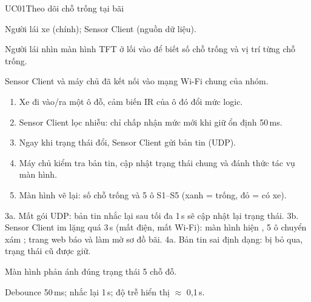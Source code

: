 \begin{usecase}{UC01}{Theo dõi chỗ trống tại bãi}
\item[Tác nhân] Người lái xe (chính); Sensor Client (nguồn dữ liệu).
\item[Mô tả] Người lái nhìn màn hình TFT ở lối vào để biết số chỗ trống và vị trí từng chỗ trống.
\item[Tiền điều kiện] Sensor Client và máy chủ đã kết nối vào mạng Wi-Fi chung của nhóm.
\item[Luồng chính] \begin{enumerate}[nosep,leftmargin=1.3em]
  \item Xe đi vào/ra một ô đỗ, cảm biến IR của ô đó đổi mức logic.
  \item Sensor Client lọc nhiễu: chỉ chấp nhận mức mới khi giữ ổn định 50\,ms.
  \item Ngay khi trạng thái đổi, Sensor Client gửi bản tin  (UDP).
  \item Máy chủ kiểm tra bản tin, cập nhật trạng thái chung và đánh thức tác vụ màn hình.
  \item Màn hình vẽ lại: số chỗ trống  và 5 ô S1–S5 (xanh = trống, đỏ = có xe).
\end{enumerate}
\item[Ngoại lệ] 3a. Mất gói UDP: bản tin nhắc lại sau tối đa 1\,s sẽ cập nhật lại trạng thái.
  3b. Sensor Client im lặng quá 3\,s (mất điện, mất Wi-Fi): màn hình hiện , 5 ô chuyển xám
      \code{----}; trang web báo  và làm mờ sơ đồ bãi.
  4a. Bản tin sai định dạng: bị bỏ qua, trạng thái cũ được giữ.
\item[Hậu điều kiện] Màn hình phản ánh đúng trạng thái 5 chỗ đỗ.
\item[Thông số] Debounce 50\,ms; nhắc lại 1\,s; độ trễ hiển thị $\approx$ 0,1\,s.
\end{usecase}

